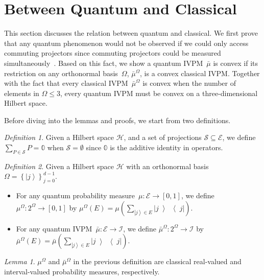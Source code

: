 \documentclass[12pt]{iopart}
\theoremstyle{remark}
\newtheorem{definition}{Definition}
\newtheorem{lemma}{Lemma}
\newcommand{\Hilb}{\mathcal{H}}
\newcommand{\events}{\ensuremath{\mathcal{E}}}
\newcommand{\ket}[1]{{\left\vert{#1}\right\rangle}}
\newcommand{\op}[2]{\ensuremath{\left\vert{#1}\middle\rangle\middle\langle{#2}\right\vert}}
\newcommand{\proj}[1]{\op{#1}{#1}}
\begin{document}
\section{Between Quantum and Classical}

This section discusses the relation between quantum and classical.
We first prove that any quantum phenomenon would not be observed if
we could only access commuting projectors since commuting projectors
could be measured simultaneously~\cite{Mermin_1993}. Based on this
fact, we show a quantum IVPM~$\bar{\mu}$ is convex if its restriction
on any orthonormal basis~$\Omega$, $\bar{\mu}^{\Omega}$, is a convex
classical IVPM. Together with the fact that every classical IVPM~$\bar{\mu}^{\Omega}$
is convex when the number of elements in $\Omega\le3$, every quantum
IVPM must be convex on a three-dimensional Hilbert space. 

Before diving into the lemmas and proofs, we start from two definitions.

\begin{definition}Given a Hilbert space $\Hilb$, and a set of projections
$\mathcal{S}\subseteq\events$, we define $\sum_{P\in\mathcal{S}}P=\mathbb{0}$
when $\mathcal{S}=\emptyset$ since $\mathbb{0}$ is the additive
identity in operators.\end{definition}

\begin{definition}\label{definition:quantum-classical}Given a Hilbert
space $\Hilb$ with an orthonormal basis~$\Omega=\left\{ \ket{j}\right\} _{j=0}^{d-1}$.
\begin{itemize}
\item For any quantum probability measure~$\mu:\events\rightarrow\left[0,1\right]$,
we define $\mu^{\Omega}:2^{\Omega}\rightarrow\left[0,1\right]$ by
$\mu^{\Omega}\left(E\right)=\mu\left(\sum_{\ket{j}\in E}\proj{j}\right)$.
\item For any quantum IVPM~$\bar{\mu}:\events\rightarrow\mathscr{I}$,
we define $\bar{\mu}^{\Omega}:2^{\Omega}\rightarrow\mathscr{I}$ by
$\bar{\mu}^{\Omega}\left(E\right)=\bar{\mu}\left(\sum_{\ket{j}\in E}\proj{j}\right)$.
\end{itemize}
\end{definition}

\begin{lemma}\label{lemma:classical-probability-measures}$\mu^{\Omega}$
and $\bar{\mu}^{\Omega}$ in the previous definition are classical
real-valued and interval-valued probability measures, respectively.\end{lemma}
\end{document}
